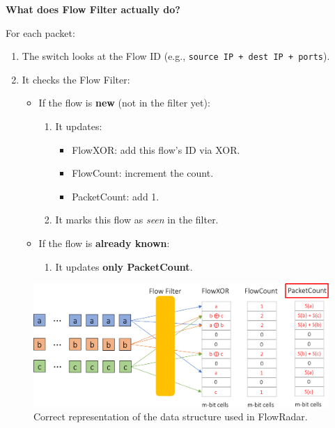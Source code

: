 \highspace
\begin{flushleft}
    \textcolor{Green3}{ \textbf{What does Flow Filter actually do?}}
\end{flushleft}
For each packet:
\begin{enumerate}
    \item The switch looks at the Flow ID (e.g., \texttt{source IP + dest IP + ports}).
    \item It checks the Flow Filter:
    \begin{itemize}
        \item If the flow is \textbf{new} (not in the filter yet):
        \begin{enumerate}
            \item It updates:
            \begin{itemize}
                \item FlowXOR: add this flow's ID via XOR.
                \item FlowCount: increment the count.
                \item PacketCount: add 1.
            \end{itemize}
            \item It marks this flow as \emph{seen} in the filter.
        \end{enumerate}
        \item If the flow is \textbf{already known}:
        \begin{enumerate}
            \item It updates \textbf{only PacketCount}.
        \end{enumerate}
    \end{itemize}
\end{enumerate}

\begin{figure}[!htp]
    \centering
    \includegraphics[width=\textwidth]{img/flowradar-2.pdf}
    \caption{Correct representation of the data structure used in FlowRadar.}
\end{figure}